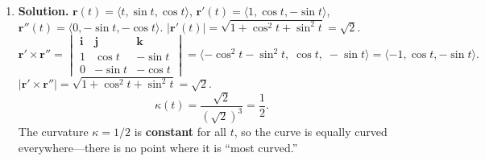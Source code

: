 \begin{enumerate}
$\mathbf{T}(1)=\frac{1}{\sqrt{6}}\langle 1,1,2\rangle$.

$\mathbf{r}''(1)=\langle 0,-1,2\rangle$.

$\mathbf{r}'\times\mathbf{r}''$ at $t=1$:
\[
\langle 1,1,2\rangle\times\langle 0,-1,2\rangle = \langle 1\cdot 2-2(-1),\; 2\cdot 0-1\cdot 2,\; 1(-1)-1\cdot 0\rangle = \langle 4,-2,-1\rangle.
\]
$|\mathbf{r}'\times\mathbf{r}''|=\sqrt{16+4+1}=\sqrt{21}$.
$\kappa=\sqrt{21}/(\sqrt{6})^3=\sqrt{21}/(6\sqrt{6})$.

To find $\mathbf{N}$, compute $\mathbf{T}'(t)$ at $t=1$.
We use: $\mathbf{T}'=\frac{\mathbf{r}''|\mathbf{r}'|^2-\mathbf{r}'(\mathbf{r}'\cdot\mathbf{r}'')}{|\mathbf{r}'|^4}\cdot|\mathbf{r}'|$.

Alternatively, use $\mathbf{N}=\mathbf{B}\times\mathbf{T}$ where $\mathbf{B}=\frac{\mathbf{r}'\times\mathbf{r}''}{|\mathbf{r}'\times\mathbf{r}''|}$.
\[
\mathbf{B}(1)=\frac{1}{\sqrt{21}}\langle 4,-2,-1\rangle.
\]
\[
\mathbf{N}(1)=\mathbf{B}(1)\times\mathbf{T}(1)=\frac{1}{\sqrt{21}\cdot\sqrt{6}}\begin{vmatrix}\mathbf{i}&\mathbf{j}&\mathbf{k}\\4&-2&-1\\1&1&2\end{vmatrix}.
\]
\[
= \frac{1}{\sqrt{126}}\langle (-2)(2)-(-1)(1),\; (-1)(1)-(4)(2),\; (4)(1)-(-2)(1)\rangle = \frac{1}{\sqrt{126}}\langle -3,-9,6\rangle.
\]
Simplify: $\langle -3,-9,6\rangle = 3\langle -1,-3,2\rangle$, $|\langle -3,-9,6\rangle|=3\sqrt{14}$.
Since $|\langle -3,-9,6\rangle|=3\sqrt{14}=\sqrt{126}$, the unit normal is:
\[
\boxed{\mathbf{N}(1)=\frac{1}{\sqrt{14}}\langle -1,-3,2\rangle, \qquad \mathbf{B}(1)=\frac{1}{\sqrt{21}}\langle 4,-2,-1\rangle.}
\]

\item \textbf{Solution.}
$\mathbf{r}(t)=\langle t, \sin t, \cos t\rangle$, $\mathbf{r}'(t)=\langle 1, \cos t, -\sin t\rangle$, $\mathbf{r}''(t)=\langle 0, -\sin t, -\cos t\rangle$.
$|\mathbf{r}'(t)|=\sqrt{1+\cos^2 t+\sin^2 t}=\sqrt{2}$.
\[
\mathbf{r}'\times\mathbf{r}'' = \begin{vmatrix}\mathbf{i}&\mathbf{j}&\mathbf{k}\\1&\cos t&-\sin t\\0&-\sin t&-\cos t\end{vmatrix} = \langle -\cos^2 t-\sin^2 t,\; \cos t,\; -\sin t\rangle = \langle -1, \cos t, -\sin t\rangle.
\]
$|\mathbf{r}'\times\mathbf{r}''|=\sqrt{1+\cos^2 t+\sin^2 t}=\sqrt{2}$.
\[
\kappa(t)=\frac{\sqrt{2}}{(\sqrt{2})^3}=\frac{1}{2}.
\]
The curvature $\kappa=1/2$ is \textbf{constant} for all $t$, so the curve is equally curved everywhere---there is no point where it is ``most curved.'' 


\end{enumerate}
